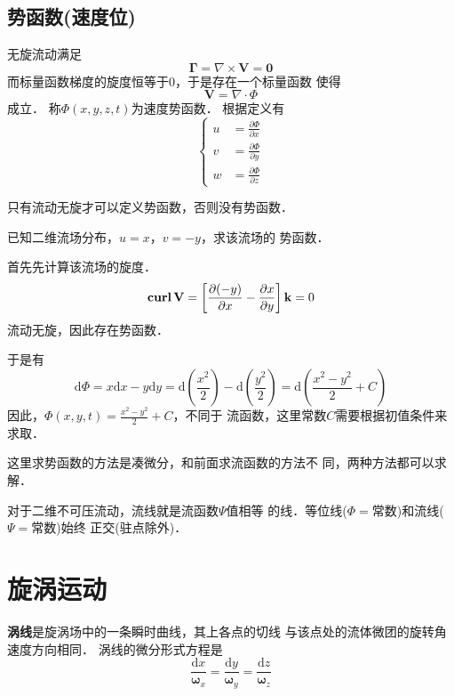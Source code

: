 \subsection{势函数(速度位)}
无旋流动满足
\[
  \mathbf{\Gamma}=\nabla \times \mathbf{V}=\mathbf{0}
\]
而标量函数梯度的旋度恒等于0，于是存在一个标量函数
使得
\[
  \mathbf{V}=\nabla \cdot \Phi
\]
成立．
称$\Phi(x,y,z,t)$为速度势函数．
根据定义有
\begin{equation*}
  \begin{cases}
    u&=\frac{\partial \Phi}{\partial x}\\ 
    v&=\frac{\partial \Phi}{\partial y}\\ 
    w&=\frac{\partial \Phi}{\partial z}
  \end{cases}
\end{equation*}
\begin{note}
只有流动无旋才可以定义势函数，否则没有势函数．
\end{note}
\begin{example}
  已知二维流场分布，$u=x $，$v=-y $，求该流场的
  势函数．

  首先先计算该流场的旋度．
  \[
    \mathbf{curl}\, \mathbf{V}=
    \left[\frac{\partial (-y)}{\partial x }-
      \frac{\partial x }{\partial y }\right]
      \mathbf{k}=0
  \]
  流动无旋，因此存在势函数．

  于是有
  \[
    \mathrm{d}\Phi=x \mathrm{d}x -y \mathrm{d}y 
    =\mathrm{d}(\frac{x^2}{2 })-\mathrm{d}
    (\frac{y^2}{2 })
    =\mathrm{d}(\frac{x^2-y^2}{2 }+C)
  \]
  因此，$\Phi(x,y,t)=\frac{x^2-y^2}{2 }+C $，不同于
  流函数，这里常数$C$需要根据初值条件来求取．
\end{example}
\begin{note}
这里求势函数的方法是凑微分，和前面求流函数的方法不
同，两种方法都可以求解．
\end{note}

\begin{notice}
  对于二维不可压流动，流线就是流函数$\Psi$值相等
  的线．等位线($\Phi=$常数)和流线($\Psi=$常数)始终
  正交(驻点除外)．
\end{notice}

\section{旋涡运动}
{\bfseries 涡线}是旋涡场中的一条瞬时曲线，其上各点的切线
与该点处的流体微团的旋转角速度方向相同．
涡线的微分形式方程是
\[
  \frac{\mathrm{d}x }{\mathbf{\omega}_x}=
  \frac{\mathrm{d}y }{\mathbf{\omega}_y}=
  \frac{\mathrm{d}z }{\mathbf{\omega}_z}
\]

